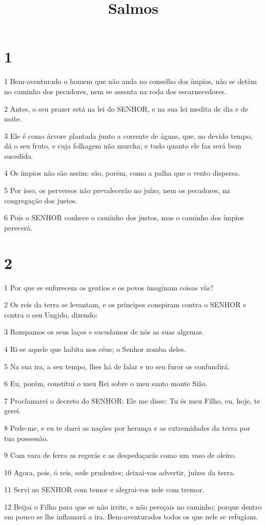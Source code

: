

\title{Salmos}


\chapter{1}

\par 1 Bem-aventurado o homem que não anda no conselho dos ímpios, não se detém no caminho dos pecadores, nem se assenta na roda dos escarnecedores.
\par 2 Antes, o seu prazer está na lei do SENHOR, e na sua lei medita de dia e de noite.
\par 3 Ele é como árvore plantada junto a corrente de águas, que, no devido tempo, dá o seu fruto, e cuja folhagem não murcha; e tudo quanto ele faz será bem sucedido.
\par 4 Os ímpios não são assim; são, porém, como a palha que o vento dispersa.
\par 5 Por isso, os perversos não prevalecerão no juízo, nem os pecadores, na congregação dos justos.
\par 6 Pois o SENHOR conhece o caminho dos justos, mas o caminho dos ímpios perecerá.

\chapter{2}

\par 1 Por que se enfurecem os gentios e os povos imaginam coisas vãs?
\par 2 Os reis da terra se levantam, e os príncipes conspiram contra o SENHOR e contra o seu Ungido, dizendo:
\par 3 Rompamos os seus laços e sacudamos de nós as suas algemas.
\par 4 Ri-se aquele que habita nos céus; o Senhor zomba deles.
\par 5 Na sua ira, a seu tempo, lhes há de falar e no seu furor os confundirá.
\par 6 Eu, porém, constituí o meu Rei sobre o meu santo monte Sião.
\par 7 Proclamarei o decreto do SENHOR: Ele me disse: Tu és meu Filho, eu, hoje, te gerei.
\par 8 Pede-me, e eu te darei as nações por herança e as extremidades da terra por tua possessão.
\par 9 Com vara de ferro as regerás e as despedaçarás como um vaso de oleiro.
\par 10 Agora, pois, ó reis, sede prudentes; deixai-vos advertir, juízes da terra.
\par 11 Servi ao SENHOR com temor e alegrai-vos nele com tremor.
\par 12 Beijai o Filho para que se não irrite, e não pereçais no caminho; porque dentro em pouco se lhe inflamará a ira. Bem-aventurados todos os que nele se refugiam.

